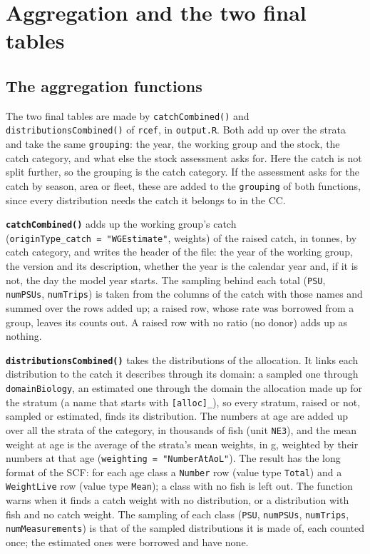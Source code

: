 \documentclass[
  a4paper,
  DIV=11,
  numbers=noendperiod]{scrartcl}
\newcounter{none} %
\begin{document}
\section{Aggregation and the two final
tables}\label{aggregation-and-the-two-final-tables}

\subsection{The aggregation functions}\label{the-aggregation-functions}

The two final tables are made by \texttt{catchCombined()} and
\texttt{distributionsCombined()} of \texttt{rcef}, in \texttt{output.R}.
Both add up over the strata and take the same \texttt{grouping}: the
year, the working group and the stock, the catch category, and what else
the stock assessment asks for. Here the catch is not split further, so
the grouping is the catch category. If the assessment asks for the catch
by season, area or fleet, these are added to the \texttt{grouping} of
both functions, since every distribution needs the catch it belongs to
in the CC.

\textbf{\texttt{catchCombined()}} adds up the working group's catch
(\texttt{originType\_catch\ =\ "WGEstimate"}, weights) of the raised
catch, in tonnes, by catch category, and writes the header of the file:
the year of the working group, the version and its description, whether
the year is the calendar year and, if it is not, the day the model year
starts. The sampling behind each total (\texttt{PSU}, \texttt{numPSUs},
\texttt{numTrips}) is taken from the columns of the catch with those
names and summed over the rows added up; a raised row, whose rate was
borrowed from a group, leaves its counts out. A raised row with no ratio
(no donor) adds up as nothing.

\textbf{\texttt{distributionsCombined()}} takes the distributions of the
allocation. It links each distribution to the catch it describes through
its domain: a sampled one through \texttt{domainBiology}, an estimated
one through the domain the allocation made up for the stratum (a name
that starts with \texttt{{[}alloc{]}\_}), so every stratum, raised or
not, sampled or estimated, finds its distribution. The numbers at age
are added up over all the strata of the category, in thousands of fish
(unit \texttt{NE3}), and the mean weight at age is the average of the
strata's mean weights, in g, weighted by their numbers at that age
(\texttt{weighting\ =\ "NumberAtAoL"}). The result has the long format
of the SCF: for each age class a \texttt{Number} row (value type
\texttt{Total}) and a \texttt{WeightLive} row (value type
\texttt{Mean}); a class with no fish is left out. The function warns
when it finds a catch weight with no distribution, or a distribution
with fish and no catch weight. The sampling of each class (\texttt{PSU},
\texttt{numPSUs}, \texttt{numTrips}, \texttt{numMeasurements}) is that
of the sampled distributions it is made of, each counted once; the
estimated ones were borrowed and have none.
\end{document}
